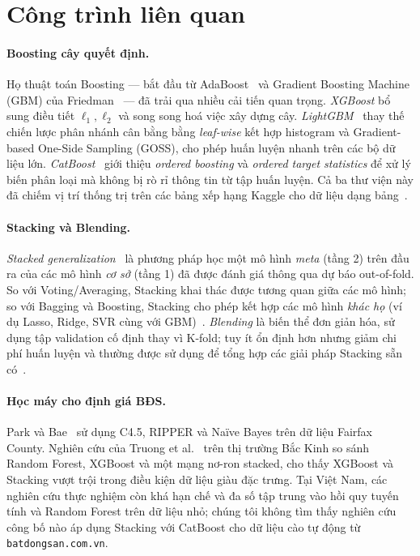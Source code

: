 \documentclass[sigconf,nonacm]{acmart}
\begin{document}
\section{Công trình liên quan}\label{sec:related}

\paragraph{Boosting cây quyết định.}
Họ thuật toán Boosting --- bắt đầu từ AdaBoost~\cite{freund1997decision}
và Gradient Boosting Machine (GBM) của Friedman~\cite{friedman2001greedy}
--- đã trải qua nhiều cải tiến quan trọng. \emph{XGBoost}
\cite{chen2016xgboost} bổ sung điều tiết $\ell_1, \ell_2$ và song song
hoá việc xây dựng cây. \emph{LightGBM}~\cite{ke2017lightgbm} thay thế
chiến lược phân nhánh cân bằng bằng \emph{leaf-wise} kết hợp histogram
và Gradient-based One-Side Sampling (GOSS), cho phép huấn luyện nhanh
trên các bộ dữ liệu lớn. \emph{CatBoost}~\cite{prokhorenkova2018catboost}
giới thiệu \emph{ordered boosting} và \emph{ordered target statistics} để
xử lý biến phân loại mà không bị rò rỉ thông tin từ tập huấn luyện. Cả
ba thư viện này đã chiếm vị trí thống trị trên các bảng xếp hạng Kaggle
cho dữ liệu dạng bảng~\cite{olson2018data}.

\paragraph{Stacking và Blending.}
\emph{Stacked generalization}~\cite{wolpert1992stacked} là phương pháp
học một mô hình \emph{meta} (tầng 2) trên đầu ra của các mô hình
\emph{cơ sở} (tầng 1) đã được đánh giá thông qua dự báo
out-of-fold. So với Voting/Averaging, Stacking khai thác được tương
quan giữa các mô hình; so với Bagging và Boosting, Stacking cho phép
kết hợp các mô hình \emph{khác họ} (ví dụ Lasso, Ridge, SVR cùng với
GBM)~\cite{breiman1996stacked}. \emph{Blending} là biến thể đơn giản
hóa, sử dụng tập validation cố định thay vì K-fold; tuy ít ổn định hơn
nhưng giảm chi phí huấn luyện và thường được sử dụng để tổng hợp các
giải pháp Stacking sẵn có~\cite{tang2017insurance}.

\paragraph{Học máy cho định giá BĐS.}
Park và Bae~\cite{park2015using} sử dụng C4.5, RIPPER và Naïve Bayes
trên dữ liệu Fairfax County. Nghiên cứu của Truong et al.~\cite{truong2020housing}
trên thị trường Bắc Kinh so sánh Random Forest, XGBoost và một mạng
nơ-ron stacked, cho thấy XGBoost và Stacking vượt trội trong điều
kiện dữ liệu giàu đặc trưng. Tại Việt Nam, các nghiên cứu thực
nghiệm còn khá hạn chế và đa số tập trung vào hồi quy tuyến tính và
Random Forest trên dữ liệu nhỏ; chúng tôi không tìm thấy nghiên cứu
công bố nào áp dụng Stacking với CatBoost cho dữ liệu cào tự động từ
\texttt{batdongsan.com.vn}.
\end{document}
